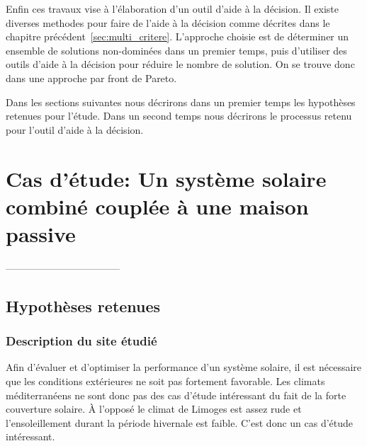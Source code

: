 
Enfin ces travaux vise à l’élaboration d’un outil d’aide à la décision. Il existe
diverses methodes pour faire de l’aide à la décision comme décrites dans le chapitre
précédent~\autoref{sec:multi_critere}. L’approche choisie est de déterminer un
ensemble de solutions non-dominées dans un premier temps, puis d’utiliser des
outils d’aide à la décision pour réduire le nombre de solution. On se trouve donc
dans une approche par front de Pareto.



Dans les sections suivantes nous décrirons dans un premier temps les hypothèses
retenues pour l’étude. Dans un second temps nous décrirons le processus retenu
pour l’outil d’aide à la décision.






\section{Cas d’étude: Un système solaire combiné couplée à une maison passive} %
\label{sec:cas_d_etude_un_systeme_solaire_combine_couplee_a_une_maison_passive}
-----------------------------------
\subsection{Hypothèses retenues} %
\label{sub:hypotheses_retenues}
\subsubsection{Description du site étudié} %
\label{ssub:description_du_site_etudie}
Afin d’évaluer et d’optimiser la performance d’un système solaire, il est nécessaire
que les conditions extérieures ne soit pas fortement favorable.
Les climats méditerranéens ne sont donc pas des cas d’étude intéressant du fait
de la forte couverture solaire.
À l’opposé le climat de Limoges est assez rude et l’ensoleillement durant la période
hivernale est faible. C’est donc un cas d’étude intéressant.

